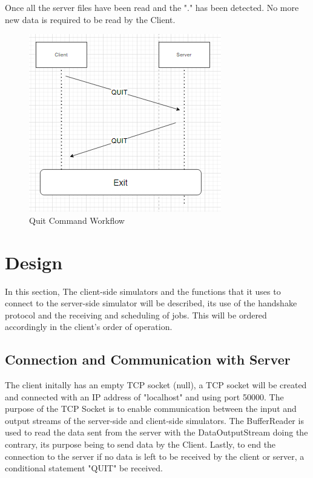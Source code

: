 \documentclass[a4paper]{article} %
\begin{document}
Once all the server files have been read and the "." has been detected. No more new data is required to be read by the Client. 

\begin{figure}[H]
\begin{center}
\includegraphics[scale=0.5]{Client-server QUIT.drawio.png}
\caption{Quit Command Workflow}
\end{center}
\end{figure}

\section{Design}
\label{sec:section3}
In this section, The client-side simulators and the functions that it uses to connect to the server-side simulator will be described, its use of the handshake protocol and the receiving and scheduling of jobs. This will be ordered accordingly in the client's order of operation.

\subsection{Connection and Communication with Server}
The client initally has an empty TCP socket (null), a TCP socket will be created and connected with an IP address of "localhost" and using port 50000. The purpose of the TCP Socket is to enable communication between the input and output streams of the server-side and client-side simulators. The BufferReader\cite{bufferreader} is used to read the data sent from the server with the DataOutputStream doing the contrary, its purpose being to send data by the Client. Lastly, to end the connection to the server if no data is left to be received by the client or server, a conditional statement "QUIT" be received. 
\end{document}
